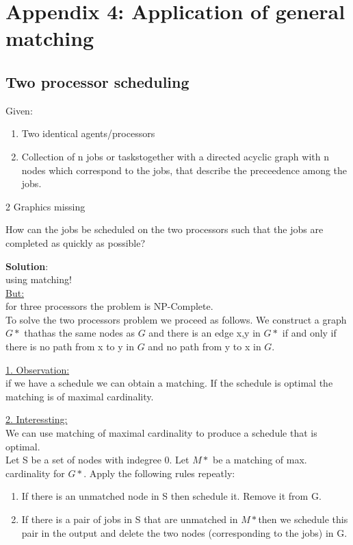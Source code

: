 \chapter*{ Appendix 4: Application of general matching}

\section{Two processor scheduling}

Given:\\
\begin{enumerate}
  \item Two identical agents/processors
  \item Collection of n jobs or taskstogether with a directed acyclic graph with n nodes which correspond to the jobs, that describe the preceedence among the jobs.
\end{enumerate}


\begin{example}
2 Graphics missing

\end{example}

How can the jobs be scheduled on the two processors such that the jobs are completed as quickly as possible?

\textbf{Solution}:\\
using matching!\\
\underline{But:}\\
for three processors the problem is NP-Complete.\\

To solve the two processors problem we proceed as follows. We construct a graph $G*$ thathas the same nodes as $G$ and there is an edge {x,y} in $G*$ if and only if there is no path from x to y in $G$ and no path from y to x in $G$.

\underline{1. Observation:}\\
if we have a schedule we can obtain a matching. If the schedule is optimal the matching is of maximal cardinality.

\underline{2. Interessting:}\\
We can use matching of maximal cardinality to produce a schedule that is optimal.\\

Let S be a set of nodes with indegree 0. Let $M*$ be a matching of max. cardinality for $G*$. Apply the following rules repeatly:\\
\begin{enumerate}
  \item If there is an unmatched node in S then schedule it. Remove it from G.
  \item If there is a pair of jobs in S that are unmatched in $M*$then we schedule this pair in the output and delete the two nodes (corresponding to the jobs) in G.
\end{enumerate}

